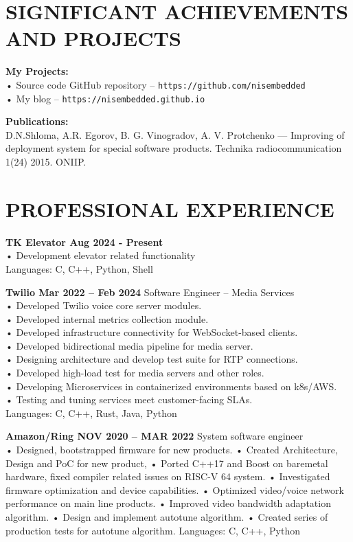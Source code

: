 \documentclass{article}
\begin{document}
\section{\textsf{SIGNIFICANT ACHIEVEMENTS AND PROJECTS}}

\textbf{My Projects:}\\
• Source code GitHub repository – \texttt{https://github.com/nisembedded}\\
• My blog – \texttt{https://nisembedded.github.io}

\bigskip\noindent
\textbf{Publications:}\\
D.N.Shloma, A.R. Egorov, B. G. Vinogradov, A. V. Protchenko — Improving of deployment
system for special software products. Technika radiocommunication 1(24) 2015. ONIIP.

\section{\textsf{PROFESSIONAL EXPERIENCE}}
\textbf{TK Elevator Aug 2024 - Present}\\
• Development elevator related functionality\\
Languages: C, C++, Python, Shell

\bigskip\noindent
\textbf{Twilio Mar 2022 – Feb 2024}
Software Engineer – Media Services\\
• Developed Twilio voice core server modules.\\
• Developed internal metrics collection module.\\
• Developed infrastructure connectivity for WebSocket-based clients.\\
• Developed bidirectional media pipeline for media server.\\
• Designing architecture and develop test suite for RTP connections.\\
• Developed high-load test for media servers and other roles.\\
• Developing Microservices in containerized environments based on k8s/AWS.\\
• Testing and tuning services meet customer-facing SLAs.\\
Languages: C, C++, Rust, Java, Python

\bigskip\noindent
\textbf{Amazon/Ring NOV 2020 – MAR 2022}
System software engineer\\
• Designed, bootstrapped firmware for new products.
• Created Architecture, Design and PoC for new product,
• Ported C++17 and Boost on baremetal hardware, fixed compiler related issues on RISC-V 64 system.
• Investigated firmware optimization and device capabilities.
• Optimized video/voice network performance on main line products.
• Improved video bandwidth adaptation algorithm.
• Design and implement autotune algorithm.
• Created series of production tests for autotune algorithm.
Languages: C, C++, Python
\end{document}
